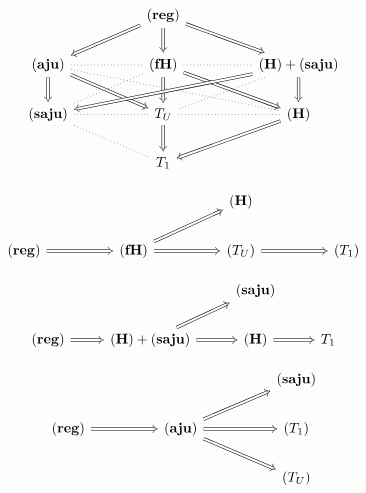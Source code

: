 \documentclass[compress,12pt]{beamer}
\begin{document}
\begin{frame}
    \[\begin{tikzcd}
	&& {\mathbf{(reg)}} \\
	{\mathbf{(aju)}} && {\mathbf{(fH)}} && {\mathbf{(H)}+\mathbf{(saju)}} \\
	{\mathbf{(saju)}} && {T_U} && {\mathbf{(H)}} \\
	&& {T_1}
	\arrow[Rightarrow, from=1-3, to=2-1]
	\arrow[Rightarrow, from=1-3, to=2-3]
	\arrow[Rightarrow, from=1-3, to=2-5]
	\arrow[dotted, no head, from=2-1, to=2-3]
	\arrow[Rightarrow, from=2-1, to=3-1]
	\arrow[Rightarrow, from=2-1, to=3-3]
	\arrow[dotted, no head, from=2-1, to=3-5]
	\arrow[dotted, no head, from=2-3, to=2-5]
	\arrow[dotted, no head, from=2-3, to=3-1]
	\arrow[Rightarrow, from=2-3, to=3-3]
	\arrow[Rightarrow, from=2-3, to=3-5]
	\arrow[Rightarrow, from=2-5, to=3-1]
	\arrow[dotted, no head, from=2-5, to=3-3]
	\arrow[Rightarrow, from=2-5, to=3-5]
	\arrow[dotted, no head, from=3-1, to=3-3]
	\arrow[dotted, no head, from=3-1, to=4-3]
	\arrow[dotted, no head, from=3-3, to=3-5]
	\arrow[Rightarrow, from=3-3, to=4-3]
	\arrow[Rightarrow, from=3-5, to=4-3]
\end{tikzcd}\]

\[\begin{tikzcd}
	&&&& {\mathbf{(H)}} \\
	{\mathbf{(reg)}} && {\mathbf{(fH)}} && {(T_U)} && {(T_1)}
	\arrow[Rightarrow, from=2-1, to=2-3]
	\arrow[Rightarrow, from=2-3, to=1-5]
	\arrow[Rightarrow, from=2-3, to=2-5]
	\arrow[Rightarrow, from=2-5, to=2-7]
\end{tikzcd}\]
\end{frame}

\begin{frame}
\[\begin{tikzcd}
	&& {\mathbf{(saju)}} \\
	{\mathbf{(reg)}} & {\mathbf{(H)}+\mathbf{(saju)}} & {\mathbf{(H)}} & {T_1}
	\arrow[Rightarrow, from=2-1, to=2-2]
	\arrow[Rightarrow, from=2-2, to=1-3]
	\arrow[Rightarrow, from=2-2, to=2-3]
	\arrow[Rightarrow, from=2-3, to=2-4]
\end{tikzcd}\]

\[\begin{tikzcd}
	&&&& {\mathbf{(saju)}} \\
	{\mathbf{(reg)}} && {\mathbf{(aju)}} && {(T_1)} \\
	&&&& {(T_U)}
	\arrow[Rightarrow, from=2-1, to=2-3]
	\arrow[Rightarrow, from=2-3, to=1-5]
	\arrow[Rightarrow, from=2-3, to=2-5]
	\arrow[Rightarrow, from=2-3, to=3-5]
\end{tikzcd}\]

    
\end{frame}
\end{document}
